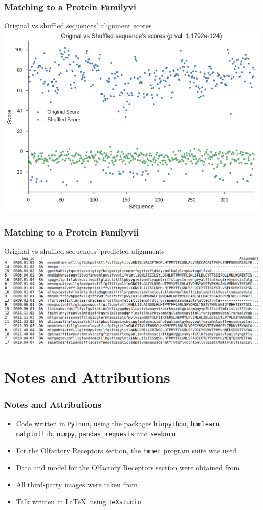 \documentclass[11pt]{beamer}
\begin{document}
    \begin{frame}
        \frametitle{Matching to a Protein Family\quad vi}
        Original vs shuffled sequences' alignment scores
        \centering
        \includegraphics[width=\textwidth]{images/or_align_results.png}
    \end{frame}

    
    \begin{frame}
        \frametitle{Matching to a Protein Family\quad vii}
        Original vs shuffled sequences' predicted alignments
        \centering
        \includegraphics[width=\textwidth]{images/or_align_sample.png}
    \end{frame}

    \section{Notes and Attributions}
    \begin{frame}
        \frametitle{Notes and Attributions}
        \begin{itemize}
            \item Code written in \texttt{Python}, using the packages \texttt{biopython}, \texttt{hmmlearn}, \texttt{matplotlib}, \texttt{numpy}, \texttt{pandas}, \texttt{requests} and \texttt{seaborn}
            \item For the Olfactory Receptors section, the \texttt{hmmer} \cite{hmmer} program suite was used
            \item Data and model for the Olfactory Receptors section were obtained from \cite{finn2016pfam}
            \item All third-party images were taken from \cite{cristianini2006introduction}
            \item Talk written in \LaTeX\ using \texttt{TeXstudio}
        \end{itemize}
    \end{frame}
\end{document}
